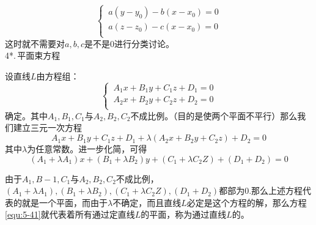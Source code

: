 \begin{equation}
	\begin{cases}
		\, a(y-y_0)-b(x-x_0)=0\\
		\, a(z-z_0)-c(x-x_0)=0\\
	\end{cases}
\end{equation}
这时就不需要对$a,b,c$是不是0进行分类讨论。
\\ 4*.$\,$平面束方程
\par 设直线$L$由方程组：
\begin{equation}
	\begin{cases}
\, A_1x+B_1y+C_1z+D_1=0\\
\, A_2x+B_2y+C_2z+D_2=0\\
\end{cases}
\end{equation}
确定。其中$A_1,B_1,C_1$与$A_2,B_2,C_2$不成比例。（目的是使两个平面不平行）那么我们建立三元一次方程
\begin{equation}
	A_1x+B_1y+C_1z+D_1+\lambda(A_2x+B_2y+C_2z)+D_2=0
\label{equ:5-41}	
\end{equation}
其中$\lambda$为任意常数。进一步化简，可得
\begin{equation}
	(A_1+\lambda A_1)x+(B_1+\lambda B_2)y+(C_1+\lambda C_2Z)+(D_1+D_2)=0
\end{equation}
\par 由于$A_1,B-1,C_1$与$A_2,B_2,C_2$不成比例，$(A_1+\lambda A_1),(B_1+\lambda B_2),(C_1+\lambda C_2Z),(D_1+D_2)$都部为0.那么上述方程代表的就是一个平面，而由于$\lambda$不确定，而且直线$L$必定是这个方程的解，那么方程\eqref{equ:5-41}就代表着所有通过定直线$L$的平面，称为通过直线$L$的。
